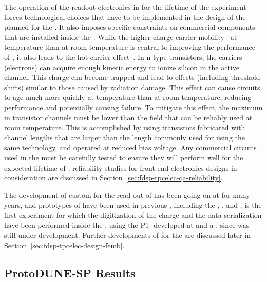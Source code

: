 The operation of the readout electronics in  for the 
\dunelifetime lifetime of the  experiment forces 
technological choices that have to be implemented in the design 
of the  planned for the . It also imposes 
specific constraints on commercial components that are installed
inside the . While the higher charge carrier 
mobility~\cite{Hairapetian1989} at  temperature than at room
temperature is central to improving the performance of , it also leads
to the hot carrier effect~\cite{Hot-electron}. In n-type  transistors, the carriers (electrons)
can acquire enough kinetic energy to ionize silicon in the active channel. This
charge can become trapped and lead to effects (including threshold shifts)
similar to those caused by radiation damage. This effect can cause 
circuits to age much more quickly at  temperature than at room temperature,
reducing performance and potentially causing failure. To mitigate this effect,
the maximum \efield in transistor channels must be lower than the field that
can be reliably used at room temperature. This is accomplished by using transistors
fabricated with channel lengths that are larger than the length commonly used
for  using the same technology, and operated at reduced bias voltage. 
Any commercial circuits used in the  must be carefully tested to ensure 
they will perform well for the expected \dunelifetime lifetime of ; 
reliability studies for front-end electronics designs in consideration are 
discussed in Section~\ref{sec:fdsp-tpcelec-qa-reliability}.

The development of custom  for the read-out of 
 has been going on at  for many years, and prototypes
of  have been used in previous  , 
including the , , and .  is the first
experiment for which the digitization of the charge and the data serialization
have been performed inside the \lar, using the P1-  
developed at  and a , since  was
still under development. Further developments of  for the
  are discussed later in Section~\ref{sec:fdsp-tpcelec-design-femb}.

\subsection{ProtoDUNE-SP Results}
\label{sec:fdsp-tpcelec-overview-pdune}


